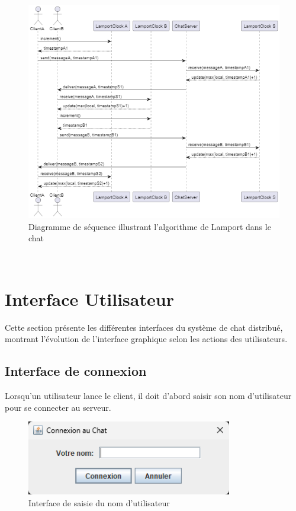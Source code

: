 \documentclass[a4paper,12pt]{article}
\begin{document}
\begin{figure}[ht!]
    \centering
    \includegraphics[width=1\textwidth]{sequence.png}
    \caption{Diagramme de séquence illustrant l'algorithme de Lamport dans le chat}
\end{figure}
\FloatBarrier\

\section{Interface Utilisateur}
Cette section présente les différentes interfaces du système de chat distribué, montrant l'évolution de l'interface graphique selon les actions des utilisateurs.

\subsection{Interface de connexion}
Lorsqu'un utilisateur lance le client, il doit d'abord saisir son nom d'utilisateur pour se connecter au serveur.

\begin{figure}[ht!]
    \centering
    \includegraphics[width=0.8\textwidth]{name.png}
    \caption{Interface de saisie du nom d'utilisateur}
\end{figure}
\FloatBarrier\
\end{document}
